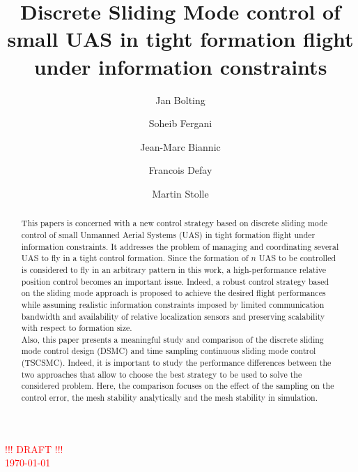 \documentclass{ifacconf}
\begin{document}
\begin{frontmatter}

\title{Discrete Sliding Mode control of small UAS in tight formation flight under information constraints}

\author[First]{Jan Bolting}
\author[Second]{Soheib Fergani}
\author[Third]{Jean-Marc Biannic}
\author[Fourth]{Francois Defay}
\author[Fifth]{Martin Stolle}

\address[First]{National Institute of Standards and Technology,
   Boulder, CO 80305 USA (e-mail: author@ boulder.nist.gov).}
\address[Second]{Colorado State University,
   Fort Collins, CO 80523 USA (e-mail: author@lamar. colostate.edu)}
\address[Third]{Electrical Engineering Department,
   Seoul National University, Seoul, Korea, (e-mail: author@snu.ac.kr)}

\textcolor{red}{\Huge !!! DRAFT !!!\\ \normalsize \today \\ \currenttime}

\begin{abstract}
This papers is concerned with a new control strategy  based on discrete sliding mode control of small Unmanned Aerial Systems (UAS) in tight formation flight under information constraints. It addresses the problem of managing and coordinating several UAS to fly in a tight control formation. Since the formation of $n$ UAS to be controlled is considered to fly in an arbitrary pattern in this work, a high-performance relative position control becomes an important issue. Indeed, a robust control strategy based on the sliding mode approach is proposed to achieve the desired flight performances while assuming realistic information constraints imposed by limited communication bandwidth and availability of relative localization sensors and preserving scalability with respect to formation size.\\
Also, this paper presents a meaningful study and comparison of the discrete sliding mode control design (DSMC) and  time sampling continuous sliding mode control (TSCSMC). Indeed, it is important to study the performance differences between the two approaches that allow to choose the best strategy to be used to solve the considered problem. Here, the comparison focuses on the effect of the sampling on the control error, the mesh stability analytically and the mesh stability in simulation.\\


\end{abstract}
\end{frontmatter}
\end{document}
